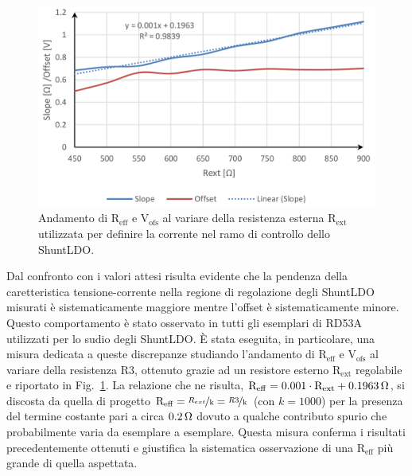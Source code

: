 \begin{figure}
\centering
\includegraphics[width=\textwidth]{Immagini/R3Karagounis}
\caption{Andamento di $\mathrm{R_{eff}}$ e $\mathrm{V_{ofs}}$ al variare della resistenza esterna $\mathrm{R_{ext}}$ utilizzata per definire la corrente nel ramo di controllo dello ShuntLDO.}%
\label{R3Karagounis}
\end{figure}
Dal confronto con i valori attesi risulta evidente che la pendenza della caretteristica tensione-corrente nella regione di regolazione degli ShuntLDO misurati è sistematicamente maggiore mentre l'offset è sistematicamente minore. 
Questo comportamento è stato osservato in tutti gli esemplari di RD53A utilizzati per lo sudio degli ShuntLDO. \`E stata eseguita, in particolare, una misura dedicata a queste discrepanze studiando l'andamento di $\mathrm{R_{eff}}$ e $\mathrm{V_{ofs}}$ al variare della resistenza $\mathrm{R3}$, ottenuto grazie ad un resistore esterno $\mathrm{R_{ext}}$ regolabile e riportato in Fig.~\ref{R3Karagounis}. La relazione che ne risulta, $\mathrm{R_{eff}} = 0.001\cdot \mathrm{R_{ext}} + 0.1963{\rm \, \Omega}$, si discosta da quella di progetto $\mathrm{R_{eff} = \nicefrac{R_{ext}}{k} = \nicefrac{R3}{k}}$ (con $k=1000$) per la presenza del termine costante pari a circa $0.2{\rm \, \Omega}$ dovuto a qualche contributo spurio che probabilmente varia da esemplare a esemplare. Questa misura conferma i risultati precedentemente ottenuti e giustifica la sistematica osservazione di una $\mathrm{R_{eff}}$ pi\`u grande di quella aspettata. 

